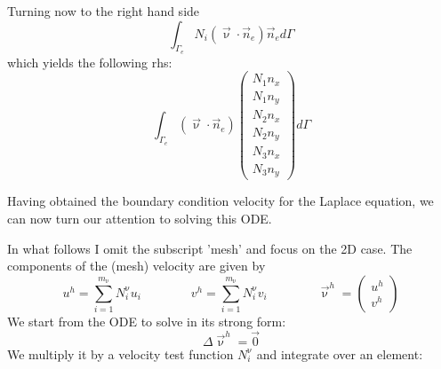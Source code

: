 Turning now to the right hand side %
\[
\int_{\Gamma_e} N_i   (\vec{\upnu}\cdot\vec{n}_e)\vec{n}_e  d\Gamma
\]
which yields the following rhs:
\[
\int_{\Gamma_e}   (\vec{\upnu}\cdot\vec{n}_e)
\left(\begin{array}{c}
N_1 n_x \\ N_1 n_y \\ 
N_2 n_x \\ N_2 n_y \\
N_3 n_x \\ N_3 n_y 
\end{array}\right)
 d\Gamma
\]


Having obtained the boundary condition velocity for the Laplace equation, we can now turn our attention 
to solving this ODE. 


In what follows I omit the subscript 'mesh' and focus on the 2D case. The components of the (mesh) velocity
are given by
\[
u^h = \sum_{i=1}^{m_\upnu} N_i^\upnu u_i
\qquad
\qquad
v^h = \sum_{i=1}^{m_\upnu} N_i^\upnu v_i
\qquad
\qquad
\vec{\upnu}^h=\left( 
\begin{array}{c}
u^h \\
v^h 
\end{array}  \right)
\]
We start from the ODE to solve in its strong form:
\[
\Delta \vec{\upnu}^h = \vec{0}
\]
We multiply it by a velocity test function $N_i^\upnu$ and integrate over an element: 
